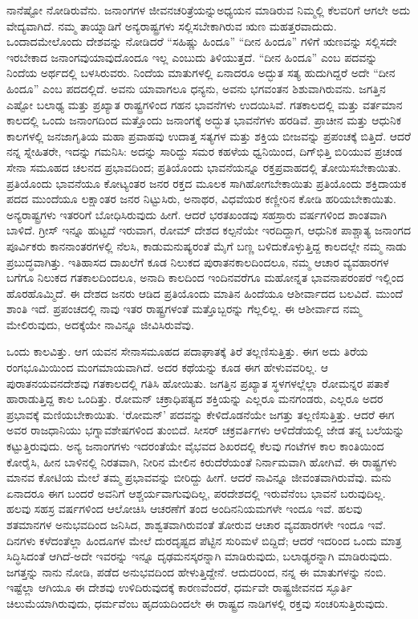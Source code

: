 ನಾನೆಷ್ಟೋ ನೋಡಿರುವೆನು. ಜನಾಂಗಗಳ ಜೀವನಚರಿತ್ರೆಯನ್ನು\break ಅಧ್ಯಯನ ಮಾಡಿರುವ ನಿಮ್ಮಲ್ಲಿ ಕೆಲವರಿಗೆ ಆಗಲೇ ಅದು ವೇದ್ಯವಾಗಿದೆ. ನಮ್ಮ ತಾಯ್ನಾಡಿಗೆ ಅನ್ಯರಾಷ್ಟ್ರಗಳು ಸಲ್ಲಿಸಬೇಕಾಗಿರುವ ಋಣ ಮಹತ್ತರವಾದುದು. ಒಂದಾದಮೇಲೊಂದು ದೇಶವನ್ನು ನೋಡಿದರೆ “ಸಹಿಷ್ಣು ಹಿಂದೂ” “ದೀನ ಹಿಂದೂ” ಗಳಿಗೆ ಋಣವನ್ನು ಸಲ್ಲಿಸದೇ ಇರಬೇಕಾದ ಜನಾಂಗವು\break ಯಾವುದೊಂದೂ ಇಲ್ಲ ಎಂಬುದು ತಿಳಿಯುತ್ತದೆ. “ದೀನ ಹಿಂದೂ” ಎಂಬ ಪದವನ್ನು ನಿಂದೆಯ ಅರ್ಥದಲ್ಲಿ ಬಳಸಿರುವರು. ನಿಂದೆಯ ಮಾತುಗಳಲ್ಲಿ ಏನಾದರೂ ಅದ್ಭುತ ಸತ್ಯ ಹುದುಗಿದ್ದರೆ ಅದೇ “ದೀನ ಹಿಂದೂ” ಎಂಬ ಪದದಲ್ಲಿದೆ. ಅವನು ಯಾವಾಗಲೂ ಧನ್ಯನು, ಅವನು ಭಗವಂತನ ಶಿಶುವಾಗಿರುವನು. ಜಗತ್ತಿನ ಎಷ್ಟೋ ಬಲಾಢ್ಯ ಮತ್ತು ಪ್ರಖ್ಯಾತ ರಾಷ್ಟ್ರಗಳಿಂದ ಗಹನ ಭಾವನೆಗಳು ಉದಯಿಸಿವೆ. ಗತಕಾಲದಲ್ಲಿ ಮತ್ತು ವರ್ತಮಾನ ಕಾಲದಲ್ಲಿ ಒಂದು ಜನಾಂಗದಿಂದ ಮತ್ತೊಂದು ಜನಾಂಗಕ್ಕೆ ಅದ್ಭುತ ಭಾವನೆಗಳು ಹರಡಿವೆ. ಪ್ರಾಚೀನ ಮತ್ತು ಆಧುನಿಕ ಕಾಲಗಳಲ್ಲಿ ಜನಜಾಗೃತಿಯ ಮಹಾ ಪ್ರವಾಹವು ಉದಾತ್ತ ಸತ್ಯಗಳ ಮತ್ತು ಶಕ್ತಿಯ ಬೀಜವನ್ನು ಪ್ರಪಂಚಕ್ಕೆ ಬಿತ್ತಿದೆ. ಆದರೆ ನನ್ನ ಸ್ನೇಹಿತರೇ, ಇದನ್ನು ಗಮನಿಸಿ: ಅದನ್ನು ಸಾರಿದ್ದು ಸಮರ ಕಹಳೆಯ ಧ್ವನಿಯಿಂದ, ದಿಗ್​ಭಿತ್ತಿ ಬಿರಿಯುವ ಪ್ರಚಂಡ ಸೇನಾ ಸಮೂಹದ ಚಲನದ ಪ್ರಭಾವದಿಂದ; ಪ್ರತಿಯೊಂದು ಭಾವನೆಯನ್ನೂ ರಕ್ತಪ್ರವಾಹದಲ್ಲಿ ತೋಯಿಸಬೇಕಾಯಿತು. ಪ್ರತಿಯೊಂದು ಭಾವನೆಯೂ ಕೋಟ್ಯಂತರ ಜನರ ರಕ್ತದ ಮೂಲಕ ಸಾಗಿಹೋಗಬೇಕಾಯಿತು ಪ್ರತಿಯೊಂದು ಶಕ್ತಿದಾಯಕ ಪದದ ಮುಂದೆಯೂ ಲಕ್ಷಾಂತರ ಜನರ ನಿಟ್ಟುಸಿರು, ಅನಾಥರ, ವಿಧವೆಯರ ಕಣ್ಣೀರಿನ ಕೋಡಿ ಹರಿಯಬೇಕಾಯಿತು. ಅನ್ಯರಾಷ್ಟ್ರಗಳು ಇತರರಿಗೆ ಬೋಧಿಸಿರುವುದು ಹೀಗೆ. ಆದರೆ ಭರತಖಂಡವು ಸಹಸ್ರಾರು ವರ್ಷಗಳಿಂದ ಶಾಂತವಾಗಿ ಬಾಳಿದೆ. ಗ್ರೀಸ್​ ಇನ್ನೂ ಹುಟ್ಟದೆ ಇರುವಾಗ, ರೋಮ್​ ದೇಶದ ಕಲ್ಪನೆಯೇ ಇರದಿದ್ದಾಗ, ಆಧುನಿಕ ಪಾಶ್ಚಾತ್ಯ ಜನಾಂಗದ ಪೂರ್ವಿಕರು ಕಾನನಾಂತರಗಳಲ್ಲಿ ನೆಲಸಿ, ಕಾಡುಮನುಷ್ಯರಂತೆ ಮೈಗೆ ಬಣ್ಣ ಬಳಿದುಕೊಳ್ಳುತ್ತಿದ್ದ ಕಾಲದಲ್ಲೇ ನಮ್ಮ ನಾಡು ಪ್ರಬುದ್ಧವಾಗಿತ್ತು. ಇತಿಹಾಸದ ದಾಖಲೆಗೆ ಕೂಡ ನಿಲುಕದ ಪುರಾತನಕಾಲದಿಂದಲೂ, ನಮ್ಮ ಆಚಾರ ವ್ಯವಹಾರಗಳ ಬಗೆಗೂ ನಿಲುಕದ ಗತಕಾಲದಿಂದಲೂ, ಅನಾದಿ ಕಾಲದಿಂದ ಇಂದಿನವರೆಗೂ ಮಹೋನ್ನತ ಭಾವನಾಪರಂಪರೆ ಇಲ್ಲಿಂದ ಹೊರಹೊಮ್ಮಿದೆ. ಈ ದೇಶದ ಜನರು ಆಡಿದ ಪ್ರತಿಯೊಂದು ಮಾತಿನ ಹಿಂದೆಯೂ ಆಶೀರ್ವಾದದ ಬಲವಿದೆ. ಮುಂದೆ ಶಾಂತಿ ಇದೆ. ಪ್ರಪಂಚದಲ್ಲಿ ನಾವು ಇತರ ರಾಷ್ಟ್ರಗಳಂತೆ ಮತ್ತೊಬ್ಬರನ್ನು ಗೆಲ್ಲಲಿಲ್ಲ. ಈ ಆಶೀರ್ವಾದ ನಮ್ಮ ಮೇಲಿರುವುದು, ಅದಕ್ಕೆಯೇ ನಾವಿನ್ನೂ ಜೀವಿಸಿರುವೆವು.

ಒಂದು ಕಾಲವಿತ್ತು. ಆಗ ಯವನ ಸೇನಾಸಮೂಹದ ಪದಾಘಾತಕ್ಕೆ ತಿರೆ ತಲ್ಲಣಿಸುತ್ತಿತ್ತು. ಈಗ ಅದು ತಿರೆಯ ರಂಗಭೂಮಿಯಿಂದ ಮಂಗಮಾಯವಾಗಿದೆ. ಅದರ ಕಥೆಯನ್ನು ಕೂಡ ಈಗ ಹೇಳುವವರಿಲ್ಲ. ಆ ಪುರಾತನ\break ಯವನದೇಶವು ಗತಕಾಲದಲ್ಲಿ ಗತಿಸಿ ಹೋಯಿತು. ಜಗತ್ತಿನ ಪ್ರಖ್ಯಾತ ಸ್ಥಳಗಳಲ್ಲೆಲ್ಲಾ ರೋಮನ್ನರ ಪತಾಕೆ ಹಾರಾಡುತ್ತಿದ್ದ ಕಾಲ ಒಂದಿತ್ತು. ರೋಮನ್​ ಚಕ್ರಾಧಿಪತ್ಯದ ಶಕ್ತಿಯನ್ನು ಎಲ್ಲರೂ ಮನಗಂಡರು, ಎಲ್ಲರೂ ಅದರ ಪ್ರಭಾವಕ್ಕೆ ಮಣಿಯಬೇಕಾಯಿತು. ‘ರೋಮನ್​’ ಪದವನ್ನು ಕೇಳಿದೊಡನೆಯೇ ಜಗತ್ತು ತಲ್ಲಣಿಸುತ್ತಿತ್ತು. ಆದರೆ ಈಗ ಅವರ ರಾಜಧಾನಿಯು ಭಗ್ನಾವಶೇಷಗಳಿಂದ ತುಂಬಿದೆ. ಸೀಸರ್​ ಚಕ್ರವರ್ತಿಗಳು ಆಳಿದೆಡೆಯಲ್ಲಿ ಜೇಡ ತನ್ನ ಬಲೆಯನ್ನು ಕಟ್ಟುತ್ತಿರುವುದು. ಅನ್ಯ ಜನಾಂಗಗಳು ಇದರಂತೆಯೇ ವೈಭವದ ಶಿಖರದಲ್ಲಿ ಕೆಲವು ಗಂಟೆಗಳ ಕಾಲ ಕಾಂತಿಯಿಂದ ಕೋರೈಸಿ, ಹೀನ ಬಾಳಿನಲ್ಲಿ ನಿರತವಾಗಿ, ನೀರಿನ ಮೇಲಿನ ಕಿರುದೆರೆಯಂತೆ ನಿರ್ನಾಮವಾಗಿ ಹೋಗಿವೆ. ಈ ರಾಷ್ಟ್ರಗಳು ಮಾನವ ಕೋಟಿಯ ಮೇಲೆ ತಮ್ಮ ಪ್ರಭಾವವನ್ನು ಬೀರಿದ್ದು ಹೀಗೆ. ಆದರೆ ನಾವಿನ್ನೂ ಜೀವಂತವಾಗಿರುವೆವು. ಮನು ಏನಾದರೂ ಈಗ ಬಂದರೆ ಅವನಿಗೆ ಆಶ್ಚರ್ಯವಾಗುವುದಿಲ್ಲ, ಪರದೇಶದಲ್ಲಿ ಇರುವೆನೆಂಬ ಭಾವನೆ ಬರುವುದಿಲ್ಲ. ಹಲವು ಸಹಸ್ರ ವರ್ಷಗಳಿಂದ ಆಲೋಚಿಸಿ ಆಚರಣೆಗೆ ತಂದ ಅಂದಿನ\break ನಿಯಮಗಳೇ ಇಂದೂ ಇವೆ. ಹಲವು ಶತಮಾನಗಳ ಅನುಭವದಿಂದ ಜನಿಸಿದ, ಶಾಶ್ವತವಾಗಿರುವಂತೆ ತೋರುವ ಆಚಾರ ವ್ಯವಹಾರಗಳೇ ಇಂದೂ ಇವೆ. ದಿನಗಳು ಕಳೆದಂತೆಲ್ಲಾ ಹಿಂದೂಗಳ ಮೇಲೆ ದುರದೃಷ್ಟದ ಪೆಟ್ಟಿನ ಸುರಿಮಳೆ ಬಿದ್ದಿದೆ; ಆದರೆ ಇದರಿಂದ ಒಂದು ಮಾತ್ರ ಸಿದ್ಧಿಸಿದಂತೆ ಆಗಿದೆ-ಅದೇ ಇವರನ್ನು ಇನ್ನೂ ದೃಢಮನಸ್ಕರನ್ನಾಗಿ ಮಾಡಿರುವುದು, ಬಲಾಢ್ಯರನ್ನಾಗಿ ಮಾಡಿರುವುದು. ಜಗತ್ತನ್ನು ನಾನು ನೋಡಿ, ಪಡೆದ ಅನುಭವದಿಂದ ಹೇಳುತ್ತಿದ್ದೇನೆ. ಆದುದರಿಂದ, ನನ್ನ ಈ ಮಾತುಗಳನ್ನು ನಂಬಿ. ಇಷ್ಟೆಲ್ಲಾ ಆಗಿಯೂ ಈ ದೇಶವು ಉಳಿದಿರುವುದಕ್ಕೆ ಕಾರಣವೆಂದರೆ, ಧರ್ಮವೇ ರಾಷ್ಟ್ರಜೀವನದ ಸ್ಫೂರ್ತಿ ಚಿಲುಮೆಯಾಗಿರುವುದು, ಧರ್ಮವೆಂಬ ಹೃದಯದಿಂದಲೇ ಈ ರಾಷ್ಟ್ರದ ನಾಡಿಗಳಲ್ಲಿ ರಕ್ತವು ಸಂಚರಿಸುತ್ತಿರುವುದು.

